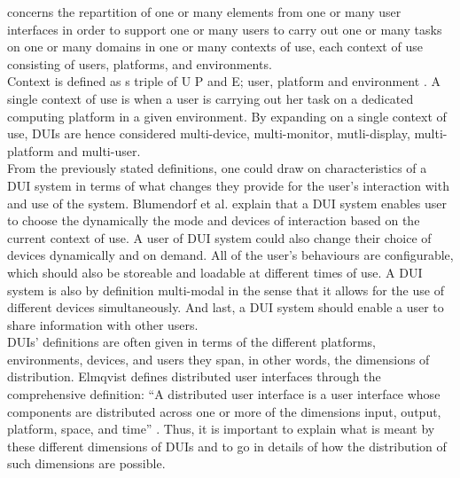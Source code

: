 concerns the repartition of one or many elements from one or many user interfaces in order to support one or many users to carry out one or many tasks on one or many domains in one or many contexts of use, each context of use consisting of users, platforms, and environments.\\
Context is defined as s triple of U P and E; user, platform and
environment \cite{vanderdonckt2010distributed}. A single context of
use is when a user is carrying out her task on a dedicated computing platform in
a given environment. By expanding on a single context of use, DUIs are hence
considered  multi-device, multi-monitor, mutli-display,
multi-platform and multi-user. \cite{vanderdonckt2010distributed}\\
From the previously stated definitions, one could draw on characteristics of a
DUI system in terms of what changes they provide for the user's interaction with
and use of the system. Blumendorf et al. \cite{blumendorf2011distributed}
explain that a DUI system enables user to choose the dynamically the mode and devices of interaction based
on the current context of use. A user of DUI system could also change their
choice of devices dynamically and on demand. All of the user's behaviours are
configurable, which should also be storeable and loadable at different times of
use. A DUI system is also by definition multi-modal in the sense that it allows
for the use of different devices simultaneously. And last, a DUI system
should enable a user to share information with other users.\\ 
DUIs' definitions are often given in terms of the different platforms,
environments, devices, and users they span, in other words, the dimensions of
distribution. Elmqvist defines distributed user interfaces through the
comprehensive definition: ``A distributed user interface is a user interface whose components are distributed across one
or more of the dimensions input, output, platform, space, and time''
\cite{elmqvist2011distributed}. Thus, it is important to explain what is meant
by these different dimensions of DUIs and to go in details of how the
distribution of such dimensions are possible.

